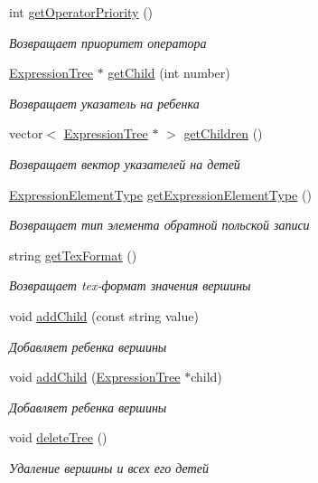 \begin{DoxyCompactItemize}
int \mbox{\hyperlink{class_expression_tree_a1456f080f1d7f83cced830dc98f22d20}{get\+Operator\+Priority}} ()
\begin{DoxyCompactList}\small\item\em Возвращает приоритет оператора \end{DoxyCompactList}\item 
\mbox{\hyperlink{class_expression_tree}{Expression\+Tree}} $\ast$ \mbox{\hyperlink{class_expression_tree_a43f4d0121efe31c0258e5932007b928e}{get\+Child}} (int number)
\begin{DoxyCompactList}\small\item\em Возвращает указатель на ребенка \end{DoxyCompactList}\item 
vector$<$ \mbox{\hyperlink{class_expression_tree}{Expression\+Tree}} $\ast$ $>$ \mbox{\hyperlink{class_expression_tree_ac9cd919de3aa4392384d35ab3c59d6d0}{get\+Children}} ()
\begin{DoxyCompactList}\small\item\em Возвращает вектор указателей на детей \end{DoxyCompactList}\item 
\mbox{\hyperlink{_expression_tree_8h_a3773a0b5484dde6ff527a03ae3b28b75}{Expression\+Element\+Type}} \mbox{\hyperlink{class_expression_tree_ab2d6cfdfb645e371d50cc5882053354f}{get\+Expression\+Element\+Type}} ()
\begin{DoxyCompactList}\small\item\em Возвращает тип элемента обратной польской записи \end{DoxyCompactList}\item 
string \mbox{\hyperlink{class_expression_tree_a2ba380c9b6d05a259f7827269cce4aea}{get\+Tex\+Format}} ()
\begin{DoxyCompactList}\small\item\em Возвращает tex-\/формат значения вершины \end{DoxyCompactList}\item 
void \mbox{\hyperlink{class_expression_tree_a1c8682a7b97a3e8a9834e545b944c61d}{add\+Child}} (const string value)
\begin{DoxyCompactList}\small\item\em Добавляет ребенка вершины \end{DoxyCompactList}\item 
void \mbox{\hyperlink{class_expression_tree_a5bc1b25f4ae25975bf086ebf3a95d6e7}{add\+Child}} (\mbox{\hyperlink{class_expression_tree}{Expression\+Tree}} $\ast$child)
\begin{DoxyCompactList}\small\item\em Добавляет ребенка вершины \end{DoxyCompactList}\item 
void \mbox{\hyperlink{class_expression_tree_a31b2699bd59541d9620fd0fbbdb1e994}{delete\+Tree}} ()
\begin{DoxyCompactList}\small\item\em Удаление вершины и всех его детей \end{DoxyCompactList}\end{DoxyCompactItemize}


